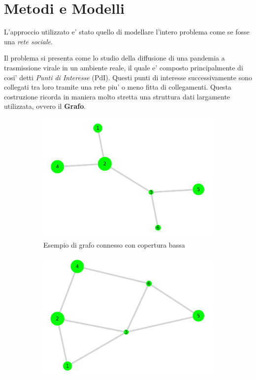 \section{Metodi e Modelli}
L'approccio utilizzato e' stato quello di modellare l'intero problema come 
se fosse una \emph{rete sociale}. 

Il problema si presenta come lo studio della diffusione di una pandemia a trasmissione
virale in un ambiente reale, il quale e' composto principalmente di cosi' detti 
\emph{Punti di Interesse} (PdI). Questi punti di interesse successivamente sono 
collegati tra loro tramite una rete piu' o meno fitta di collegamenti. Questa costruzione
ricorda in maniera molto stretta una struttura dati largamente utilizzata, ovvero il \textbf{Grafo}.

\begin{figure}[!hb]
	\centering
	\begin{subfigure}[b]{0.3\textwidth}
		\centering
		\includegraphics[width=\textwidth]{img/plot_4.pdf}
		\caption{Esempio di grafo connesso con copertura bassa}
		\label{fig:connected_graph_example_low}
	\end{subfigure}
	\hfill
	\begin{subfigure}[b]{0.3\textwidth}
		\centering
		\includegraphics[width=\textwidth]{img/plot_5.pdf}

\end{subfigure}
\end{figure}
